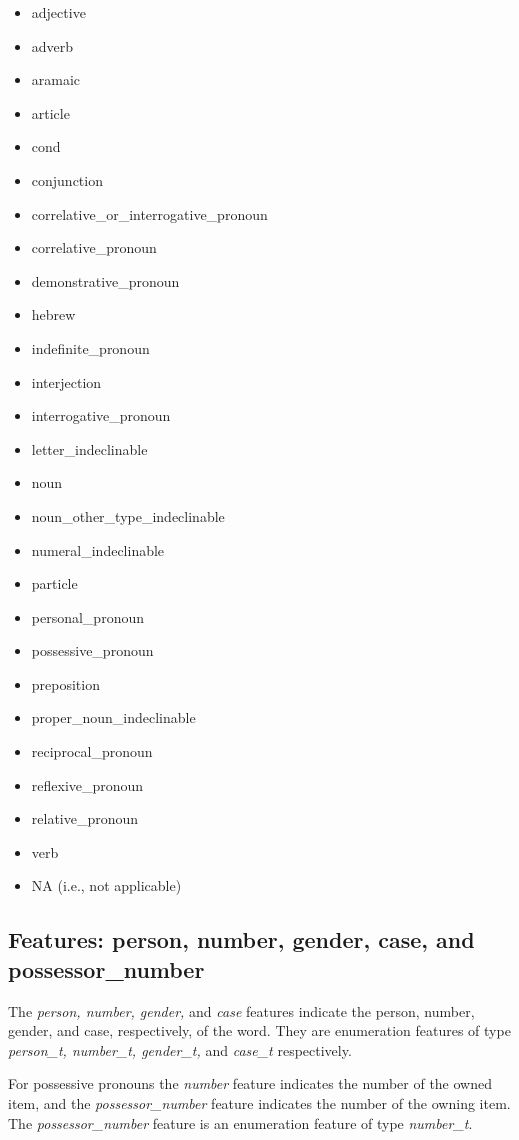 \documentclass[11pt,oneside,a4paper]{memoir}
\begin{document}
\begin{itemize}
\item adjective
\item adverb
\item aramaic
\item article
\item cond
\item conjunction
\item correlative\_or\_interrogative\_pronoun
\item correlative\_pronoun
\item demonstrative\_pronoun
\item hebrew
\item indefinite\_pronoun
\item interjection
\item interrogative\_pronoun
\item letter\_indeclinable
\item noun
\item noun\_other\_type\_indeclinable
\item numeral\_indeclinable
\item particle
\item personal\_pronoun
\item possessive\_pronoun
\item preposition
\item proper\_noun\_indeclinable
\item reciprocal\_pronoun
\item reflexive\_pronoun
\item relative\_pronoun
\item verb
\item NA (i.e., not applicable)
\end{itemize}

\subsection{Features: person, number, gender, case, and possessor\_number}


The \emph{person, number, gender,} and \emph{case} features indicate the person, number, gender, and
case, respectively, of the word. They are enumeration features of type \emph{person\_t, number\_t,
  gender\_t,} and \emph{case\_t} respectively.

For possessive pronouns the \emph{number} feature indicates the number of the owned item, and the
\emph{possessor\_number} feature indicates the number of the owning item. The
\emph{possessor\_number} feature is an enumeration feature of type \emph{number\_t}.
\end{document}
